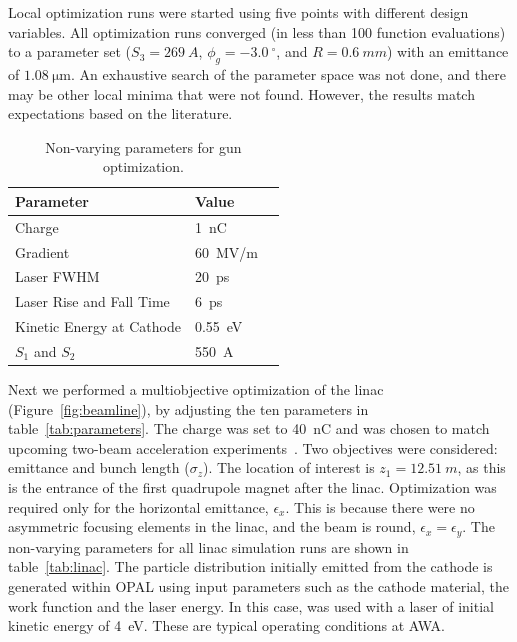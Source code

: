 Local optimization runs were started using five points 
with different design variables. All optimization runs converged 
(in less than 100 function evaluations) to a parameter set ($S_3=\SI{269}{A}$,
$\phi_g=\SI{-3.0}{^{\circ}}$, and $R=\SI{0.6}{mm}$) with an emittance of $\SI{1.08}{\um}$.
An exhaustive search of the parameter space was not done, and there may be other local minima that were not found.
However, the results match expectations based on the literature. 
\begin{table}%
	\caption{\label{tab:gun} Non-varying parameters for gun optimization.}
	\begin{center}
		\begin{tabular}{lll}
			\toprule
			\textbf{Parameter} & \textbf{Value} \\
			\midrule
			Charge  & \SI{1}{nC} \\
			Gradient & \SI{60}{MV/m} \\
			Laser FWHM & \SI{20}{ps} \\
			Laser Rise and Fall Time & \SI{6}{ps} \\
			Kinetic Energy at Cathode  & \SI{0.55}{eV} \\
			$S_1$ and $S_2$ & \SI{550}{A} \\
			\bottomrule
		\end{tabular}
	\end{center}
\end{table}

\label{sec:linacopt}
Next we performed a multiobjective optimization of the linac (Figure~\ref{fig:beamline}), 
by adjusting the ten parameters in table~\ref{tab:parameters}. The charge was set to \SI{40}{nC}
and was chosen to match upcoming two-beam acceleration experiments~\cite{tba2017}. 
Two objectives were considered: emittance and bunch length ($\sigma_z$). 
The location of interest is $z_1=\SI{12.51}{m}$, as this is the entrance of the first 
quadrupole magnet after the linac. Optimization was required only for the horizontal emittance, $\epsilon_{x}$.  This is because there were no asymmetric focusing elements in the linac, and the beam is round, $\epsilon_{x}=\epsilon_{y}$. 
The non-varying parameters for all linac simulation runs are shown in table~\ref{tab:linac}.  The particle distribution initially emitted from the cathode is generated within OPAL using input parameters such as the cathode material, the work function and the laser energy.  In this case, was used with a laser of initial kinetic energy of \SI{4}{eV}. 
These are typical operating conditions at AWA. 


